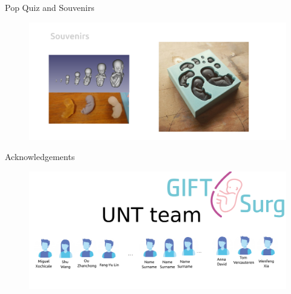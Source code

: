 {
\begin{frame}{Pop Quiz and Souvenirs}
  \begin{figure}
  \centering
  \includegraphics[width=1.0\textwidth]{./figures/popquiz-souvenirs/versions/drawing-Ss-v02}
  \end{figure}

\end{frame}
}



{
\begin{frame}{Acknowledgements}

  \begin{figure}
  \centering
  \includegraphics[width=1.0\textwidth]{./figures/team/versions/drawing-v02.png}
  \end{figure}

\end{frame}
}